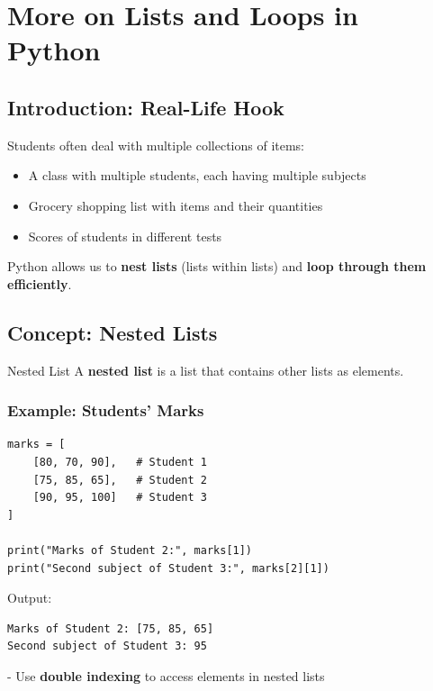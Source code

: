 \chapter{More on Lists and Loops in Python}

\section{Introduction: Real-Life Hook}

Students often deal with multiple collections of items:

\begin{itemize}
    \item A class with multiple students, each having multiple subjects  
    \item Grocery shopping list with items and their quantities  
    \item Scores of students in different tests  
\end{itemize}

Python allows us to \textbf{nest lists} (lists within lists) and \textbf{loop through them efficiently}.

\section{Concept: Nested Lists}

\begin{definition}{Nested List}
A \textbf{nested list} is a list that contains other lists as elements.
\end{definition}

\subsection{Example: Students’ Marks}

\begin{verbatim}
marks = [
    [80, 70, 90],   # Student 1
    [75, 85, 65],   # Student 2
    [90, 95, 100]   # Student 3
]

print("Marks of Student 2:", marks[1])
print("Second subject of Student 3:", marks[2][1])
\end{verbatim}

Output:

\begin{verbatim}
Marks of Student 2: [75, 85, 65]
Second subject of Student 3: 95
\end{verbatim}

- Use \textbf{double indexing} to access elements in nested lists  

